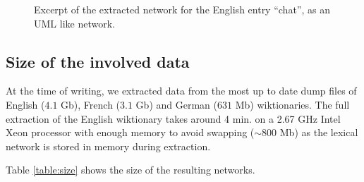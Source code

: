 \documentclass[10pt, a4paper]{article}
\begin{document}
\begin{figure}[htb]
\caption{Excerpt of the extracted network for the English entry ``chat'', as an UML like network.}
\label{extr:chatrdfenuml}
\end{figure}


\subsection{Size of the involved data}

At the time of writing, we extracted data from the most up to date dump files of English ($4.1$ Gb), French ($3.1$ Gb) and German ($631$ Mb) wiktionaries. The full extraction of the English wiktionary takes around 4 min. on a 2.67 GHz Intel Xeon processor with enough memory to avoid swapping ($\sim 800$ Mb) as the lexical network is stored in memory during extraction.


Table \ref{table:size} shows the size of the resulting networks.

\end{document}
